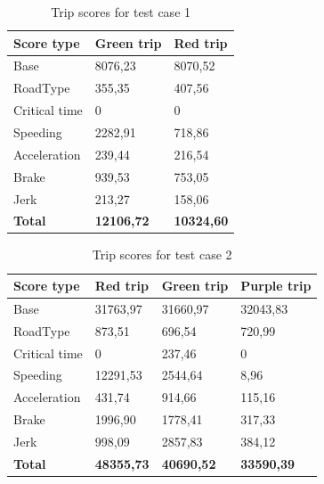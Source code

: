 \begin{table}
    \begin{tabular}{lll}
    \textbf{Score type} & \textbf{Green trip} & \textbf{Red trip} \\ \hline
    Base                & 8076,23             & 8070,52           \\
    RoadType            & 355,35              & 407,56            \\
    Critical time       & 0                   & 0                 \\
    Speeding            & 2282,91             & 718,86            \\
    Acceleration        & 239,44              & 216,54            \\
    Brake               & 939,53              & 753,05            \\
    Jerk                & 213,27              & 158,06            \\ \hline
    \textbf{Total}      & \textbf{12106,72}   & \textbf{10324,60} \\ \hline
    \end{tabular}
    \caption{Trip scores for test case 1}
    \label{tab:shorttripscores}
\end{table}

\begin{table}
    \begin{tabular}{llll}
    \textbf{Score type} & \textbf{Red trip} & \textbf{Green trip} & \textbf{Purple trip} \\ \hline
    Base                & 31763,97            & 31660,97          & 32043,83             \\
    RoadType            & 873,51              & 696,54            & 720,99               \\
    Critical time       & 0                   &  237,46           & 0                    \\
    Speeding            & 12291,53            & 2544,64           & 8,96                 \\
    Acceleration        & 431,74              & 914,66            & 115,16               \\
    Brake               & 1996,90             & 1778,41           & 317,33               \\
    Jerk                & 998,09              & 2857,83           & 384,12               \\ \hline
    \textbf{Total}      & \textbf{48355,73}   & \textbf{40690,52} & \textbf{33590,39}    \\ \hline
    \end{tabular}
    \caption{Trip scores for test case 2}
    \label{tab:longtripscores}
\end{table}


